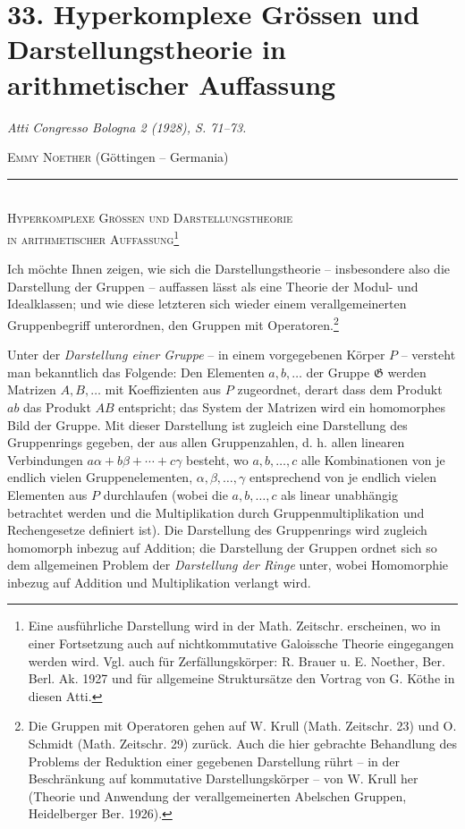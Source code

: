 \section*{33. Hyperkomplexe Grössen und Darstellungstheorie in arithmetischer Auffassung}
\emph{Atti Congresso Bologna 2 (1928), S. 71--73.}

\begingroup
\renewcommand{\thefootnote}{(\arabic{footnote})}

\begin{center}
\textsc{Emmy Noether} (Göttingen -- Germania)\\[-0.1em]
\rule{3em}{0.4pt}\\[0.8em]
\textsc{Hyperkomplexe Grössen und Darstellungstheorie}\\
\textsc{in arithmetischer Auffassung}\footnote{Eine ausführliche Darstellung wird in der Math. Zeitschr. erscheinen, wo in einer Fortsetzung auch auf nichtkommutative Galoissche Theorie eingegangen werden wird. Vgl. auch für \guillemotleft Zerfällungskörper\guillemotright: R. Brauer u. E. Noether, Ber. Berl. Ak. 1927 und für allgemeine Struktursätze den Vortrag von G. Köthe in diesen Atti.}
\end{center}

Ich möchte Ihnen zeigen, wie sich die Darstellungstheorie -- insbesondere also die Darstellung der Gruppen -- auffassen lässt als eine Theorie der Modul- und Idealklassen; und wie diese letzteren sich wieder einem verallgemeinerten Gruppenbegriff unterordnen, den Gruppen mit Operatoren.\footnote{Die Gruppen mit Operatoren gehen auf W. Krull (Math. Zeitschr. 23) und O. Schmidt (Math. Zeitschr. 29) zurück. Auch die hier gebrachte Behandlung des Problems der Reduktion einer gegebenen Darstellung rührt -- in der Beschränkung auf kommutative Darstellungskörper -- von W. Krull her (Theorie und Anwendung der verallgemeinerten Abelschen Gruppen, Heidelberger Ber. 1926).}

Unter der \emph{Darstellung einer Gruppe} -- in einem vorgegebenen Körper $P$ -- versteht man bekanntlich das Folgende: Den Elementen $a,b,\ldots$ der Gruppe $\mathfrak{G}$ werden Matrizen $A,B,\ldots$ mit Koeffizienten aus $P$ zugeordnet, derart dass dem Produkt $ab$ das Produkt $AB$ entspricht; das System der Matrizen wird ein homomorphes Bild der Gruppe. Mit dieser Darstellung ist zugleich eine Darstellung des \guillemotleft Gruppenrings\guillemotright{} gegeben, der aus allen \guillemotleft Gruppenzahlen\guillemotright, d. h. allen linearen Verbindungen $a\alpha+b\beta+\cdots+c\gamma$ besteht, wo $a,b,\ldots,c$ alle Kombinationen von je endlich vielen Gruppenelementen, $\alpha,\beta,\ldots,\gamma$ entsprechend von je endlich vielen Elementen aus $P$ durchlaufen (wobei die $a,b,\ldots,c$ als linear unabhängig betrachtet werden und die Multiplikation durch Gruppenmultiplikation und Rechengesetze definiert ist). Die Darstellung des Gruppenrings wird zugleich homomorph inbezug auf Addition; die Darstellung der Gruppen ordnet sich so dem allgemeinen Problem der \emph{Darstellung der Ringe} unter, wobei Homomorphie inbezug auf Addition und Multiplikation verlangt wird.

